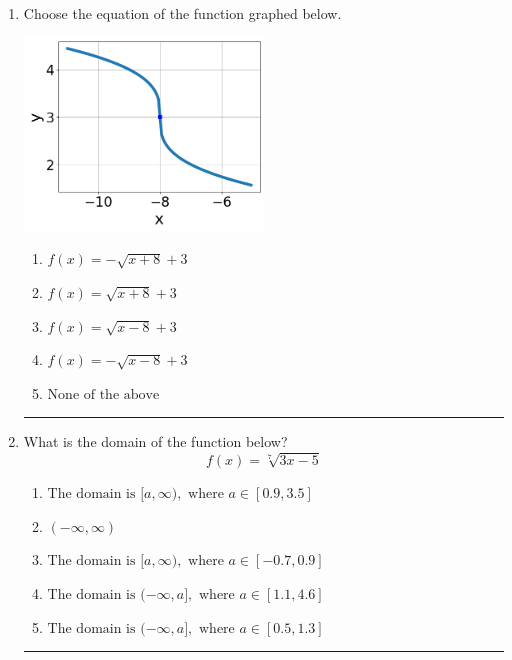 \documentclass[14pt]{extbook}
\newcommand{\litem}[1]{\item#1\hspace*{-1cm}\rule{\textwidth}{0.4pt}}
\begin{document}
\begin{enumerate}
{\begin{enumerate}[label=\Alph*.]
\end{enumerate} }
\litem{
Choose the equation of the function graphed below.
\begin{center}
    \includegraphics[width=0.5\textwidth]{../Figures/radicalGraphToEquationCopyA.png}
\end{center}
\begin{enumerate}[label=\Alph*.]
\item \( f(x) = - \sqrt{x + 8} + 3 \)
\item \( f(x) = \sqrt{x + 8} + 3 \)
\item \( f(x) = \sqrt{x - 8} + 3 \)
\item \( f(x) = - \sqrt{x - 8} + 3 \)
\item \( \text{None of the above} \)

\end{enumerate} }
\litem{
What is the domain of the function below?\[ f(x) = \sqrt[7]{3 x - 5} \]\begin{enumerate}[label=\Alph*.]
\item \( \text{The domain is } [a, \infty), \text{   where } a \in [0.9, 3.5] \)
\item \( (-\infty, \infty) \)
\item \( \text{The domain is } [a, \infty), \text{   where } a \in [-0.7, 0.9] \)
\item \( \text{The domain is } (-\infty, a], \text{   where } a \in [1.1, 4.6] \)
\item \( \text{The domain is } (-\infty, a], \text{   where } a \in [0.5, 1.3] \)


\end{enumerate}}
\end{enumerate}
\end{document}
